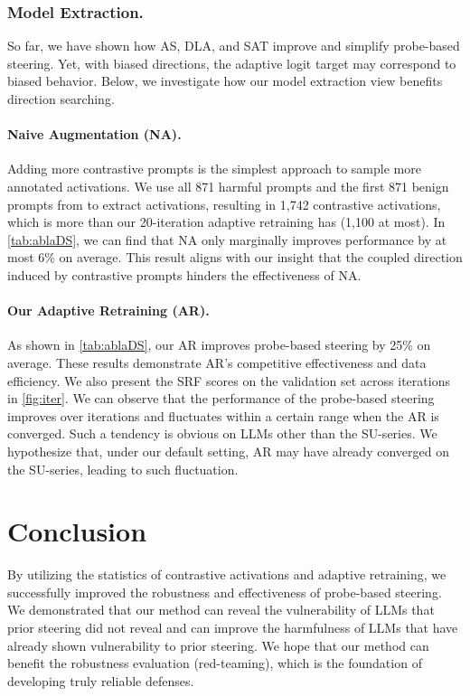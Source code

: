 \documentclass{article}
\theoremstyle{plain}
\theoremstyle{definition}
\theoremstyle{remark}
\begin{document}
\subsubsection{Model Extraction.}

So far, we have shown how AS, DLA, and SAT improve and simplify probe-based steering. Yet, with biased directions, the adaptive logit target may correspond to biased behavior. Below, we investigate how our model extraction view benefits direction searching.

\paragraph{Naive Augmentation (NA).} Adding more contrastive prompts is the simplest approach to sample more annotated activations. We use all 871 harmful prompts and the first 871 benign prompts from \citet{singleDirection} to extract activations, resulting in 1,742 contrastive activations, which is more than our 20-iteration adaptive retraining has (1,100 at most). In \cref{tab:ablaDS}, we can find that NA only marginally improves performance by at most 6\% on average. This result aligns with our insight that the coupled direction induced by contrastive prompts hinders the effectiveness of NA.

\paragraph{Our Adaptive Retraining (AR).} As shown in \cref{tab:ablaDS}, our AR improves probe-based steering by 25\% on average. These results demonstrate AR's competitive effectiveness and data efficiency. We also present the SRF scores on the validation set across iterations in \cref{fig:iter}. We can observe that the performance of the probe-based steering improves over iterations and fluctuates within a certain range when the AR is converged. Such a tendency is obvious on LLMs other than the SU-series. We hypothesize that, under our default setting, AR may have already converged on the SU-series, leading to such fluctuation.




\section{Conclusion}\label{sec:conclusion}

By utilizing the statistics of contrastive activations and adaptive retraining, we successfully improved the robustness and effectiveness of probe-based steering. We demonstrated that our method can reveal the vulnerability of LLMs that prior steering did not reveal and can improve the harmfulness of LLMs that have already shown vulnerability to prior steering. We hope that our method can benefit the robustness evaluation (red-teaming), which is the foundation of developing truly reliable defenses.%
\end{document}
